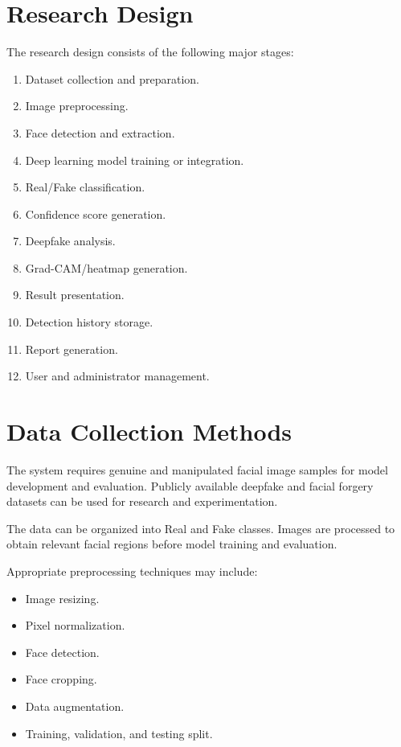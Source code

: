 \documentclass[12pt,a4paper,oneside]{report}
\begin{document}
\section{Research Design}

The research design consists of the following major stages:

\begin{enumerate}
    \item Dataset collection and preparation.
    \item Image preprocessing.
    \item Face detection and extraction.
    \item Deep learning model training or integration.
    \item Real/Fake classification.
    \item Confidence score generation.
    \item Deepfake analysis.
    \item Grad-CAM/heatmap generation.
    \item Result presentation.
    \item Detection history storage.
    \item Report generation.
    \item User and administrator management.
\end{enumerate}

\section{Data Collection Methods}

The system requires genuine and manipulated facial image samples for model development and evaluation. Publicly available deepfake and facial forgery datasets can be used for research and experimentation.

The data can be organized into Real and Fake classes. Images are processed to obtain relevant facial regions before model training and evaluation.

Appropriate preprocessing techniques may include:

\begin{itemize}
    \item Image resizing.
    \item Pixel normalization.
    \item Face detection.
    \item Face cropping.
    \item Data augmentation.
    \item Training, validation, and testing split.
\end{itemize}
\end{document}

